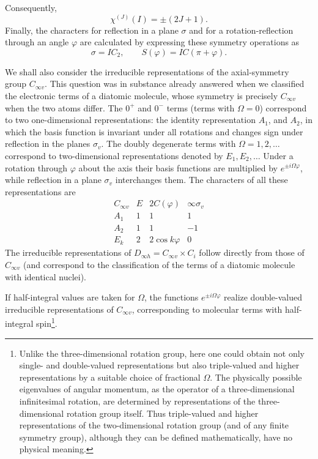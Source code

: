 Consequently,
\begin{equation}
 \chi^{(J)}(I)=\pm(2J+1).
 \tag{98.4}
\end{equation}
Finally, the characters for reflection in a plane $\sigma$ and for a rotation-reflection through an angle $\varphi$ are calculated by expressing these symmetry operations as
\[
 \sigma=IC_2,\qquad S(\varphi)=IC(\pi+\varphi).
\]

We shall also consider the irreducible representations of the axial-symmetry group $C_{\infty v}$. This question was in substance already answered when we classified the electronic terms of a diatomic molecule, whose symmetry is precisely $C_{\infty v}$ when the two atoms differ. The $0^+$ and $0^-$ terms (terms with $\Omega=0$) correspond to two one-dimensional representations: the identity representation $A_1$, and $A_2$, in which the basis function is invariant under all rotations and changes sign under reflection in the planes $\sigma_v$. The doubly degenerate terms with $\Omega=1,2,\ldots$ correspond to two-dimensional representations denoted by $E_1,E_2,\ldots$ Under a rotation through $\varphi$ about the axis their basis functions are multiplied by $e^{\pm i\Omega\varphi}$, while reflection in a plane $\sigma_v$ interchanges them. The characters of all these representations are
\begin{equation}
\begin{array}{c|ccc}
 C_{\infty v}&E&2C(\varphi)&\infty\sigma_v\\ \hline
 A_1&1&1&1\\
 A_2&1&1&-1\\
 E_k&2&2\cos k\varphi&0
\end{array}
\tag{98.5}
\end{equation}
The irreducible representations of $D_{\infty h}=C_{\infty v}\times C_i$ follow directly from those of $C_{\infty v}$ (and correspond to the classification of the terms of a diatomic molecule with identical nuclei).

If half-integral values are taken for $\Omega$, the functions $e^{\pm i\Omega\varphi}$ realize double-valued irreducible representations of $C_{\infty v}$, corresponding to molecular terms with half-integral spin\footnote{Unlike the three-dimensional rotation group, here one could obtain not only single- and double-valued representations but also triple-valued and higher representations by a suitable choice of fractional $\Omega$. The physically possible eigenvalues of angular momentum, as the operator of a three-dimensional infinitesimal rotation, are determined by representations of the three-dimensional rotation group itself. Thus triple-valued and higher representations of the two-dimensional rotation group (and of any finite symmetry group), although they can be defined mathematically, have no physical meaning.}.

